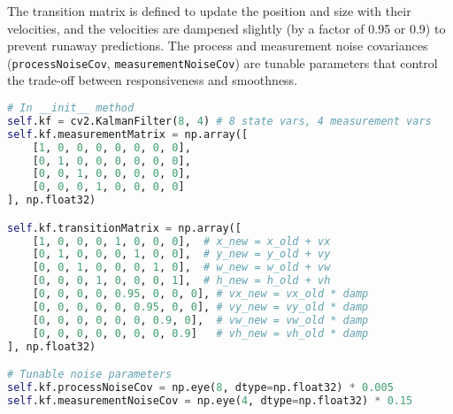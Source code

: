 \documentclass[12pt, a4paper]{article}
\begin{document}
The transition matrix is defined to update the position and size with their velocities, and the velocities are dampened slightly (by a factor of 0.95 or 0.9) to prevent runaway predictions. The process and measurement noise covariances (\texttt{processNoiseCov}, \texttt{measurementNoiseCov}) are tunable parameters that control the trade-off between responsiveness and smoothness.

\begin{lstlisting}[language=Python, caption={Kalman Filter setup with an 8D state model.}, label={lst:kalman_setup}]
# In __init__ method
self.kf = cv2.KalmanFilter(8, 4) # 8 state vars, 4 measurement vars
self.kf.measurementMatrix = np.array([
    [1, 0, 0, 0, 0, 0, 0, 0],
    [0, 1, 0, 0, 0, 0, 0, 0],
    [0, 0, 1, 0, 0, 0, 0, 0],
    [0, 0, 0, 1, 0, 0, 0, 0]
], np.float32)

self.kf.transitionMatrix = np.array([
    [1, 0, 0, 0, 1, 0, 0, 0],  # x_new = x_old + vx
    [0, 1, 0, 0, 0, 1, 0, 0],  # y_new = y_old + vy
    [0, 0, 1, 0, 0, 0, 1, 0],  # w_new = w_old + vw
    [0, 0, 0, 1, 0, 0, 0, 1],  # h_new = h_old + vh
    [0, 0, 0, 0, 0.95, 0, 0, 0], # vx_new = vx_old * damp
    [0, 0, 0, 0, 0, 0.95, 0, 0], # vy_new = vy_old * damp
    [0, 0, 0, 0, 0, 0, 0.9, 0],  # vw_new = vw_old * damp
    [0, 0, 0, 0, 0, 0, 0, 0.9]   # vh_new = vh_old * damp
], np.float32)

# Tunable noise parameters
self.kf.processNoiseCov = np.eye(8, dtype=np.float32) * 0.005
self.kf.measurementNoiseCov = np.eye(4, dtype=np.float32) * 0.15
\end{lstlisting}
\end{document}

